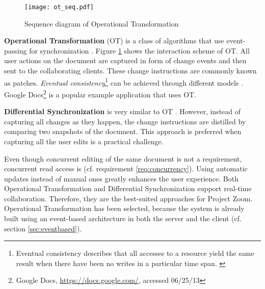 \begin{figure}[!h]
\begin{center}
\texttt{[image: ot\_seq.pdf]}
\caption{Sequence diagram of Operational Transformation}

\label{fig:optr}
\end{center}
\end{figure}

\textbf{Operational Transformation} (OT) is a class of algorithms that use event-passing for synchronization \cite{Ellis_1989}. Figure \ref{fig:optr} shows the interaction scheme of OT. All user actions on the document are captured in form of change events and then sent to the collaborating clients. These change instructions are commonly known as patches. \textit{Eventual consistency}\footnote{Eventual consistency describes that all accesses to a resource yield the same result when there have been no writes in a particular time span. \cite{Gustavsson_2002}} can be achieved through different models \cite{Sun_1998} \cite{Li_2004} \cite{Li_2005}. Google Docs\footnote{Google Docs, \url{https://docs.google.com/}, accessed 06/25/13} is a popular example application that uses OT.

\textbf{Differential Synchronization} is very similar to OT \cite{Fraser_2009}. However, instead of capturing all changes as they happen, the change instructions are distilled by comparing two snapshots of the document. This approach is preferred when capturing all the user edits is a practical challenge.

Even though concurrent editing of the same document is not a requirement, concurrent read access is (cf. requirement \ref{req:concurrency}). Using automatic updates instead of manual ones greatly enhances the user experience. Both Operational Transformation and Differential Synchronization support real-time collaboration. Therefore, they are the best-suited approaches for Project Zoom. Operational Transformation has been selected, because the system is already built using an event-based architecture in both the server \cite{Bocklisch_2013} and the client (cf. section \ref{sec:eventbased}).

